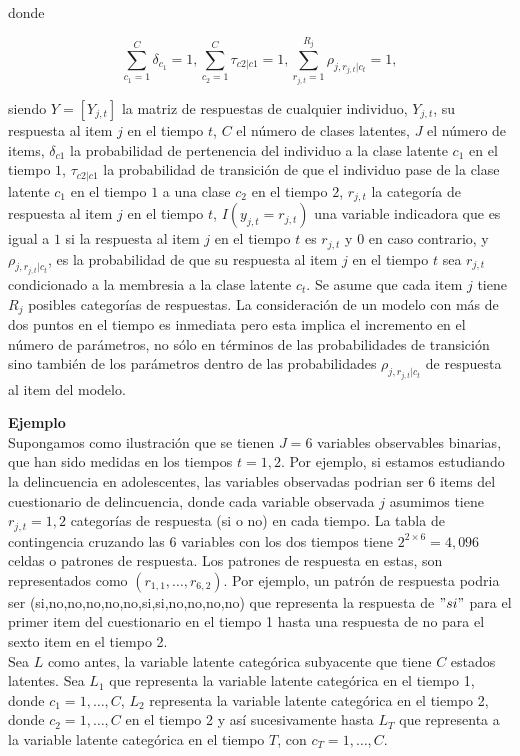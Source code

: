 			\noindent
			donde
			
			\begin{equation}
				\sum _{ c_1 =1 }^{C}{\delta _{c_1} } =1,
				\sum _{ { c }_{ 2 }=1 }^{ C }{ { \tau  }_{ c2|c1 } } =1,
				\sum _{ r_{j,t}=1 }^{R_j}{\rho_{j,r_{j,t}|c_t} }  =1 ,\label{2.17}
			\end{equation}
			
			siendo $Y = [Y_ {j,t}]$ la matriz de respuestas de cualquier individuo, $Y_{j,t}$, su respuesta al item $j$ en el tiempo $t$, $C$ el n\'{u}mero de clases latentes, $J$ el n\'{u}mero de items, $\delta _{c1}$ la probabilidad de pertenencia del individuo a la clase latente $c_1$ en el tiempo $1$, $\tau_{c2|c1}$ la probabilidad de transici\'{o}n de que el individuo pase de la clase latente $c_1$ en el tiempo $1$ a una clase $c_2$ en el tiempo $2$, $r_{j, t}$ la categor\'{i}a de respuesta al item $j$ en el tiempo $t$, $I(y_{j,t}=r_{j,t})$ una variable indicadora que es igual a $1$ si la respuesta al item $j$ en el tiempo $t$ es  $r_{j,t}$ y $0$ en caso contrario, y $\rho_{j,r_{j,t}|c_t}$, es la probabilidad de que su respuesta al item $j$ en el tiempo $t$ sea $r_{j,t}$ condicionado a la membresia a la clase latente $c_t$. Se asume que cada item $j$ tiene ${ R }_{ j }$ posibles categor\'{i}as de respuestas. La consideraci\'{o}n de un modelo con m\'{a}s de dos puntos en el tiempo es inmediata pero esta implica el incremento en el n\'{u}mero de par\'{a}metros, no s\'{o}lo en t\'{e}rminos de las probabilidades de transici\'{o}n sino tambi\'{e}n de los par\'{a}metros dentro de las probabilidades $\rho_{j,r_{j,t}|c_t}$ de respuesta al item del modelo.
			
			\noindent
			\textbf{Ejemplo}\\
			Supongamos como ilustraci\'{o}n que se tienen $J=6$ variables observables binarias, que han sido medidas en los tiempos $t=1,2$. Por ejemplo, si estamos estudiando la delincuencia en adolescentes, las variables observadas podrian ser 6 items del cuestionario de delincuencia, donde cada variable observada $j$ asumimos tiene ${r}_{j,t }=1,2$ categor\'{i}as de respuesta (si o no) en cada tiempo. La tabla de contingencia cruzando las 6 variables con los dos tiempos tiene ${ 2 }^{ 2\times 6 }=4,096$ celdas o patrones de respuesta. Los patrones de respuesta en estas, son representados como $({ r }_{ 1,1 },\ldots ,{r}_{6,2})$. Por ejemplo, un patr\'{o}n de respuesta podria ser (si,no,no,no,no,no,si,si,no,no,no,no) que representa la respuesta de $"si"$ para el primer item del cuestionario en el tiempo 1 hasta una respuesta de no para el sexto item en el tiempo 2.\\
			Sea $L$ como antes, la variable latente categ\'{o}rica subyacente que tiene $C$ estados latentes. Sea ${L}_{1}$ que representa la variable latente categ\'{o}rica en el tiempo 1, donde ${ c }_{ 1 }=1,\ldots ,C$, ${L}_{2}$ representa la variable latente categ\'{o}rica en el tiempo 2, donde ${ c }_{ 2 }=1,\ldots ,C$ en el tiempo 2 y as\'{i} sucesivamente hasta ${ L }_{ T }$ que representa a la variable latente categ\'{o}rica en el tiempo $T$, con ${ c }_{ T }=1,\ldots ,C$. 
			
